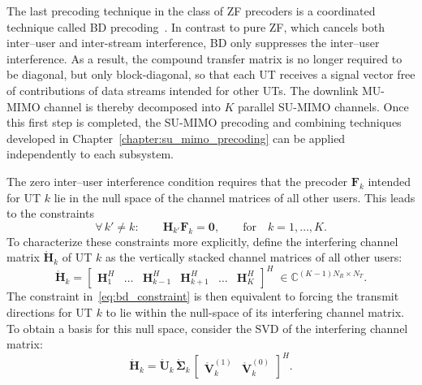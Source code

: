 The last precoding technique in the class of \ac{ZF} precoders is a coordinated technique called \acf{BD} precoding~\cite{BD_precoding_0}.
In contrast to pure \ac{ZF}, which cancels both inter--user and inter-stream interference, \ac{BD} only suppresses the inter--user interference.
As a result, the compound transfer matrix is no longer required to be diagonal, but only block-diagonal, so that each \ac{UT} receives a signal vector free of contributions of data streams intended for other \acp{UT}.
The downlink \ac{MU}-\ac{MIMO} channel is thereby decomposed into $K$ parallel \ac{SU}-\ac{MIMO} channels.
Once this first step is completed, the \ac{SU}-\ac{MIMO} precoding and combining techniques developed in Chapter~\ref{chapter:su_mimo_precoding} can be applied independently to each subsystem.

The zero inter--user interference condition requires that the precoder $\mathbf{F}_k$ intended for \ac{UT} $k$ lie in the null space of the channel matrices of all other users.
This leads to the constraints
\begin{equation}
\label{eq:bd_constraint}
    \forall \, k' \neq k : \qquad \mathbf{H}_{k'} \mathbf{F}_k = \mathbf{0}, \qquad \text{for} \quad k = 1, \dots, K.
\end{equation}
To characterize these constraints more explicitly, define the interfering channel matrix $\mathring{\mathbf{H}}_k$ of \ac{UT} $k$ as the vertically stacked channel matrices of all other users:
\begin{equation}
\label{eq:interfering_channel_matrix}
    \mathring{\mathbf{H}}_k = \begin{bmatrix} \mathbf{H}_1^H & \dots & \mathbf{H}_{k-1}^H & \mathbf{H}_{k+1}^H & \dots & \mathbf{H}_K^H \end{bmatrix}^H \; \in \mathbb{C}^{(K-1)N_R \times N_T}.
\end{equation}
The constraint in~\eqref{eq:bd_constraint} is then equivalent to forcing the transmit directions for \ac{UT} $k$ to lie within the null-space of its interfering channel matrix.\\
To obtain a basis for this null space, consider the \ac{SVD} of the interfering channel matrix:
\begin{equation}
\label{eq:svd_interfering_channel_matrix}
    \mathring{\mathbf{H}}_k = \mathring{\mathbf{U}}_k \, \mathring{\boldsymbol{\Sigma}}_k \, \begin{bmatrix} \mathring{\mathbf{V}}_{k}^{(1)} & \mathring{\mathbf{V}}_{k}^{(0)} \end{bmatrix}^H.
\end{equation}
